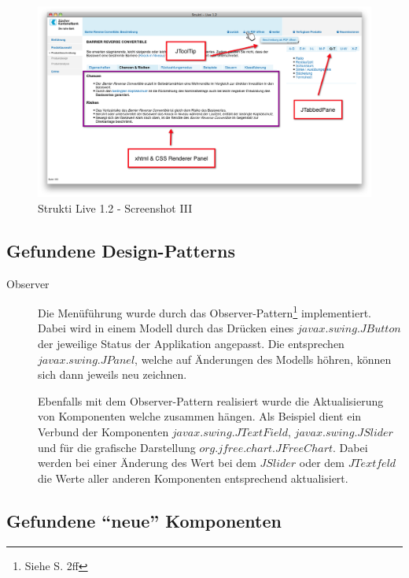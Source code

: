   \begin{figure}[htb]
    \begin{center}
      \includegraphics[width=\textwidth]{./image/SL/SL-03.png}
      \caption{Strukti Live 1.2 - Screenshot III}
      \label{img:SL-03}
    \end{center}
  \end{figure}
  
  \subsection{Gefundene Design-Patterns}
  
  \begin{description}
    \item[Observer]
    Die Menüführung wurde durch das Observer-Pattern\footnote{Siehe
    \cite{GUIDesignPatterns} S. 2ff} implementiert. Dabei wird in einem
    Modell durch das Drücken eines \(javax.swing.JButton\) der jeweilige Status
    der Applikation angepasst. Die entsprechen \(javax.swing.JPanel\), welche
    auf Änderungen des Modells höhren, können sich dann jeweils neu
    zeichnen.

    Ebenfalls mit dem Observer-Pattern realisiert wurde die Aktualisierung
    von Komponenten welche zusammen hängen. Als Beispiel dient ein Verbund der
    Komponenten \(javax.swing.JTextField\), \(javax.swing.JSlider\) und für die
    grafische Darstellung \(org.jfree.chart.JFreeChart\). Dabei werden bei
    einer Änderung des Wert bei dem \(JSlider\) oder dem \(JTextfeld\) die Werte
    aller anderen Komponenten entsprechend aktualisiert.
  \end{description}
  
  \subsection{Gefundene ``neue'' Komponenten}
  
